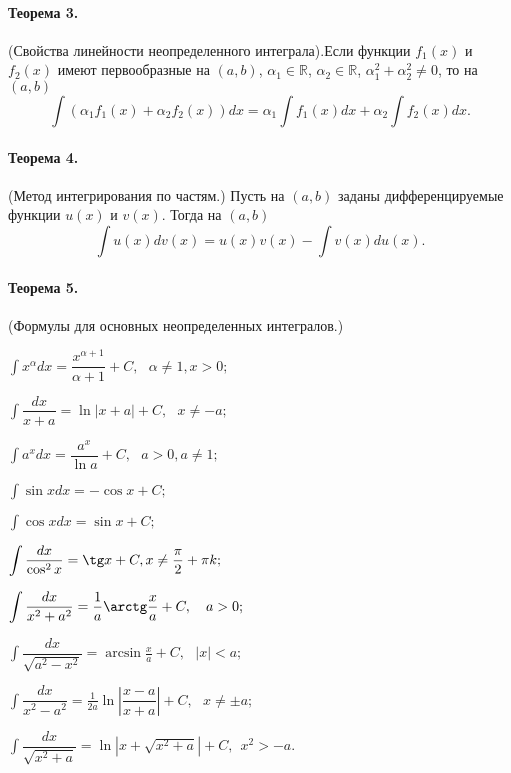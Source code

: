 \documentclass[a4paper,12pt]{article} %
\newcommand{\abs}[1]{\left|#1\right|}
\begin{document}
\paragraph{Теорема 3.} (Свойства линейности неопределенного
интеграла).Если функции $ f_1(x) $ и $ f_2(x) $ имеют
первообразные на $ (a, b) $, $ \alpha_1\in\mathbb{R} $, 
$ \alpha_2\in\mathbb{R} $, $ \alpha_1^2+\alpha_2^2\ne0 $, 
то на $ (a, b) $
\begin{equation}
	\int(\alpha_1f_1(x)+\alpha_2f_2(x))dx=
	\alpha_1\int f_1(x)dx+\alpha_2\int f_2(x)dx.
\end{equation}
\paragraph{Теорема 4.}(Метод интегрирования по частям.)
Пусть на $ (a, b) $ заданы дифференцируемые функции 
$ u(x) $ и $ v(x) $. Тогда на $ (a, b) $
\begin{equation}
	\int u(x)dv(x)=u(x)v(x)-\int v(x)du(x).
\end{equation}
\newpage
\paragraph{Теорема 5.}(Формулы для основных неопределенных
интегралов.)
\begin{enumerate}
\begin{multicols}{2}
		\item $ \displaystyle\int x^{\alpha}dx=
		\dfrac{x^{\alpha+1}}{\alpha+1}+C, ~~~ \alpha\ne1, x>0;$
		\item $ \displaystyle\int\dfrac{dx}{x+a}=
		\ln\abs{x+a}+C, ~~~ x\ne -a; $
		\item $ \displaystyle\int a^xdx=
		\dfrac{a^x}{\ln a}+C, ~~~ a>0, a\ne1; $
		\item $ \displaystyle\int\sin xdx=-\cos x+C; $
		\item $ \displaystyle\int\cos xdx=\sin x+C; $
		\item $ \displaystyle\int\dfrac{dx}{\cos^2x}=
		\tg x+C, x\ne\frac{\pi}{2}+\pi k; $
		\item $ \displaystyle\int\dfrac{dx}{x^2+a^2}=
		\frac{1}{a}\arctg\frac{x}{a}+C, ~~~ a>0; $
		\item $  \displaystyle\int\dfrac{dx}{\sqrt{a^2-x^2}}=
		\arcsin \frac{x}{a}+C, ~~~ \abs{x}<a;$
		\item $  \displaystyle\int\dfrac{dx}{x^2-a^2}=
		\frac{1}{2a}\ln\abs{\dfrac{x-a}{x+a}}+C,~~~x\ne\pm a;$
		\item 
		$  \displaystyle\int\dfrac{dx}{\sqrt{x^2+a}}=
		\ln\abs{x+\sqrt{x^2+a}}+C,~~x^2>-a. $
\end{multicols}
\end{enumerate}
\end{document}
